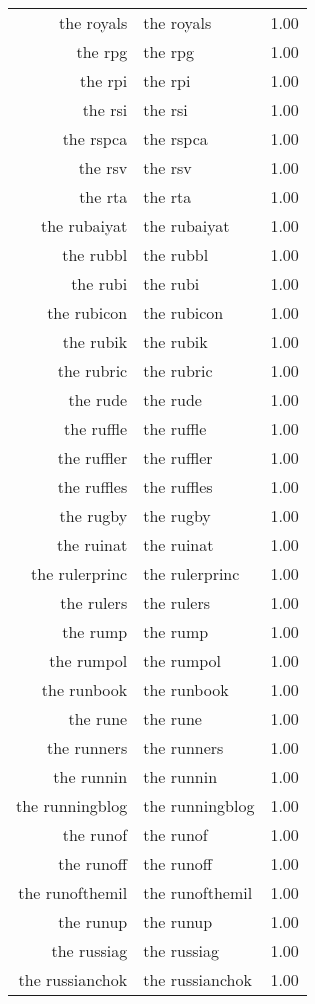 \begin{table}[ht]
\begin{tabular}{rlr}
  the royals & the royals & 1.00 \\ 
  the rpg & the rpg & 1.00 \\ 
  the rpi & the rpi & 1.00 \\ 
  the rsi & the rsi & 1.00 \\ 
  the rspca & the rspca & 1.00 \\ 
  the rsv & the rsv & 1.00 \\ 
  the rta & the rta & 1.00 \\ 
  the rubaiyat & the rubaiyat & 1.00 \\ 
  the rubbl & the rubbl & 1.00 \\ 
  the rubi & the rubi & 1.00 \\ 
  the rubicon & the rubicon & 1.00 \\ 
  the rubik & the rubik & 1.00 \\ 
  the rubric & the rubric & 1.00 \\ 
  the rude & the rude & 1.00 \\ 
  the ruffle & the ruffle & 1.00 \\ 
  the ruffler & the ruffler & 1.00 \\ 
  the ruffles & the ruffles & 1.00 \\ 
  the rugby & the rugby & 1.00 \\ 
  the ruinat & the ruinat & 1.00 \\ 
  the rulerprinc & the rulerprinc & 1.00 \\ 
  the rulers & the rulers & 1.00 \\ 
  the rump & the rump & 1.00 \\ 
  the rumpol & the rumpol & 1.00 \\ 
  the runbook & the runbook & 1.00 \\ 
  the rune & the rune & 1.00 \\ 
  the runners & the runners & 1.00 \\ 
  the runnin & the runnin & 1.00 \\ 
  the runningblog & the runningblog & 1.00 \\ 
  the runof & the runof & 1.00 \\ 
  the runoff & the runoff & 1.00 \\ 
  the runofthemil & the runofthemil & 1.00 \\ 
  the runup & the runup & 1.00 \\ 
  the russiag & the russiag & 1.00 \\ 
  the russianchok & the russianchok & 1.00 \\ 

\end{tabular}
\end{table}
